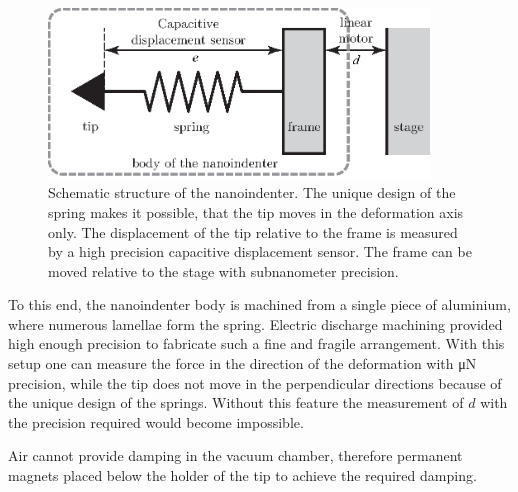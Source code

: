 \documentclass[a5paper,twoside,10pt]{article}
\begin{document}
\begin{figure}[htbp!] 
\centering    
\includegraphics[width=0.9\textwidth]{rugo}
\caption{Schematic structure of the nanoindenter. The unique design of the spring makes it possible, that the tip moves in the deformation axis only. The displacement of the tip relative to the frame is measured by a high precision capacitive displacement sensor. The frame can be moved relative to the stage with subnanometer precision.}
\label{fig:rugo}
\end{figure}

To this end, the nanoindenter body is machined from a single piece of aluminium, where numerous lamellae form the spring. Electric discharge machining provided high enough precision to fabricate such a fine and fragile arrangement. With this setup one can measure the force in the direction of the deformation with \si{\micro\newton} precision, while the tip does not move in the perpendicular directions because of the unique design of the springs. Without this feature the measurement of $d$ with the precision required would become impossible.

Air cannot provide damping in the vacuum chamber, therefore permanent magnets placed below the holder of the tip to achieve the required damping.
\end{document}
